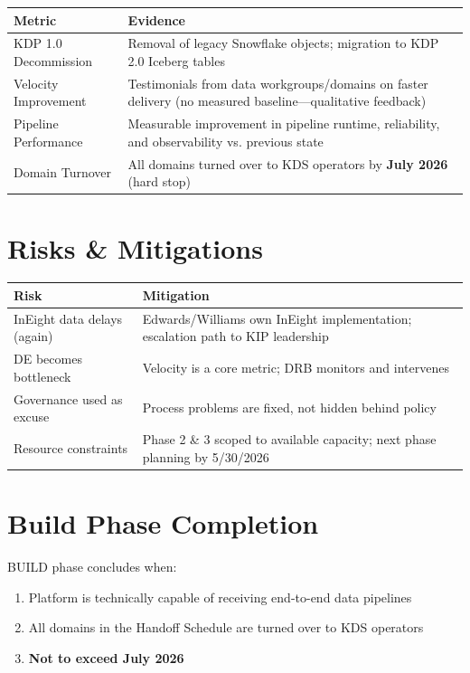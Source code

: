 \documentclass[12pt, a4paper]{article}
\begin{document}
\begin{tabular}{@{}p{4cm}p{9.5cm}@{}}
\toprule
\textbf{Metric} & \textbf{Evidence} \\
\midrule
KDP 1.0 Decommission & Removal of legacy Snowflake objects; migration to KDP 2.0 Iceberg tables \\
Velocity Improvement & Testimonials from data workgroups/domains on faster delivery (no measured baseline—qualitative feedback) \\
Pipeline Performance & Measurable improvement in pipeline runtime, reliability, and observability vs. previous state \\
Domain Turnover & All domains turned over to KDS operators by \textbf{July 2026} (hard stop) \\
\bottomrule
\end{tabular}

\section{Risks \& Mitigations}

\begin{tabular}{@{}p{4.5cm}p{9cm}@{}}
\toprule
\textbf{Risk} & \textbf{Mitigation} \\
\midrule
InEight data delays (again) & Edwards/Williams own InEight implementation; escalation path to KIP leadership \\
DE becomes bottleneck & Velocity is a core metric; DRB monitors and intervenes \\
Governance used as excuse & Process problems are fixed, not hidden behind policy \\
Resource constraints & Phase 2 \& 3 scoped to available capacity; next phase planning by 5/30/2026 \\
\bottomrule
\end{tabular}

\section{Build Phase Completion}

BUILD phase concludes when:
\begin{enumerate}
    \item Platform is technically capable of receiving end-to-end data pipelines
    \item All domains in the Handoff Schedule are turned over to KDS operators
    \item \textbf{Not to exceed July 2026}
\end{enumerate}
\end{document}
